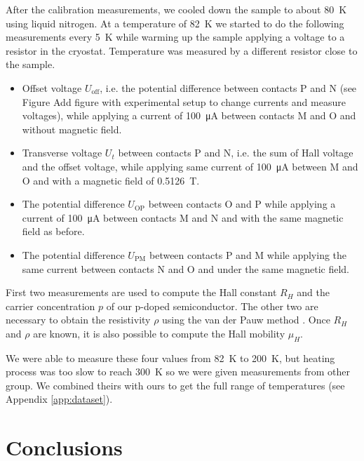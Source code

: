 \documentclass[11pt,a4paper]{article}
\begin{document}
After the calibration measurements, we cooled down the sample to about \SI{80}{\kelvin} using liquid nitrogen. At a temperature of \SI{82}{\kelvin} we started to do the following measurements every \SI{5}{\kelvin} while warming up the sample applying a voltage to a resistor in the cryostat. Temperature was measured by a different resistor close to the sample.
\begin{itemize}
\item Offset voltage $U_\text{off}$, i.e. the potential difference between contacts P and N (see Figure {\color{red}Add figure with experimental setup to change currents and measure voltages}), while applying a current of \SI{100}{\micro\ampere} between contacts M and O and without magnetic field.
\item Transverse voltage $U_t$ between contacts P and N, i.e. the sum of Hall voltage and the offset voltage, while applying same current of \SI{100}{\micro\ampere} between M and O and with a magnetic field of \SI{0.5126}{\tesla}.
\item The potential difference $U_\text{OP}$ between contacts O and P while applying a current of \SI{100}{\micro\ampere} between contacts M and N and with the same magnetic field as before.
\item The potential difference $U_\text{PM}$ between contacts P and M while applying the same current between contacts N and O and under the same magnetic field.
\end{itemize}

First two measurements are used to compute the Hall constant $R_H$ and the carrier concentration $p$ of our p-doped semiconductor. The other two are necessary to obtain the resistivity $\rho$ using the van der Pauw method \cite{vdP}. Once $R_H$ and $\rho$ are known, it is also possible to compute the Hall mobility $\mu_H$.

We were able to measure these four values from \SI{82}{\kelvin} to \SI{200}{\kelvin}, but heating process was too slow to reach \SI{300}{\kelvin} so we were given measurements from other group. We combined theirs with ours to get the full range of temperatures (see Appendix \ref{app:dataset}).

\section{Conclusions}

\nocite{*}
\vfill


\end{document}

